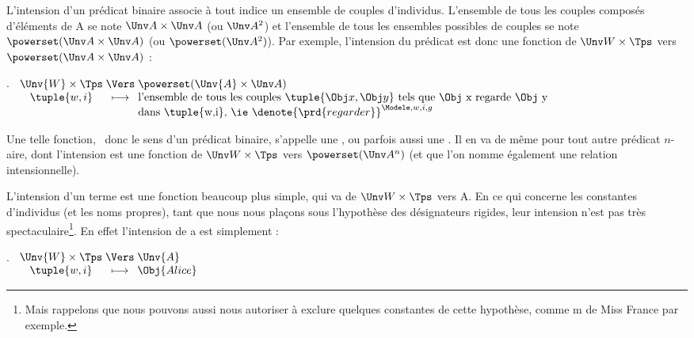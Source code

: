 L'intension d'un prédicat binaire associe à tout indice un ensemble de couples d'individus. L'ensemble de tous les couples composés d'éléments de \Unv A se note $\Unv A \times \Unv A$ (ou $\Unv A^2$) et l'ensemble de tous les ensembles possibles de couples se note $\powerset(\Unv A \times \Unv A)$ (ou $\powerset(\Unv A^2)$).
Par exemple, l'intension du prédicat  est donc une fonction de $\Unv W\times \Tps$ vers $\powerset(\Unv A\times \Unv A)$ :

\ex.  
\(%
\begin{array}[t]{c@{\;}c@{\;}l}
\Unv{W}\times\Tps &\Vers& \powerset(\Unv{A}\times\Unv A)\\
\tuple{w,i} &\longmapsto& \text{l'ensemble de tous les couples } \tuple{\Obj x,\Obj y} \text{ tels que \Obj x regarde \Obj y}\\
&& \text{dans \tuple{w,i}, \ie\ } \denote{\prd{regarder}}^{\Modele,w,i,g}
  \end{array}\)\label{intregarder}

Une telle fonction, \ie\ donc le sens d'un prédicat binaire, s'appelle une , ou parfois aussi une .
Il en va de même pour tout autre prédicat $n$-aire, dont l'intension est une fonction de $\Unv W\times\Tps$ vers $\powerset(\Unv A^n)$ (et que l'on nomme également une relation intensionnelle).

L'intension d'un terme est une fonction beaucoup plus simple, qui va de $\Unv W \times\Tps$ vers \Unv A. 
En ce qui concerne les constantes d'individus (et les noms propres), tant que nous nous plaçons sous l'hypothèse des désignateurs rigides, leur intension n'est pas très spectaculaire\footnote{Mais rappelons que nous pouvons aussi nous autoriser à exclure quelques constantes de cette hypothèse, comme \cns m de Miss France par exemple.}. En effet l'intension de \cns a est simplement :

\ex.  
\(%
\begin{array}[t]{c@{\;}c@{\;}l}
\Unv{W}\times\Tps &\Vers& \Unv{A}\\
\tuple{w,i} &\longmapsto& \Obj{Alice} %
  \end{array}\)\label{intAlice}

